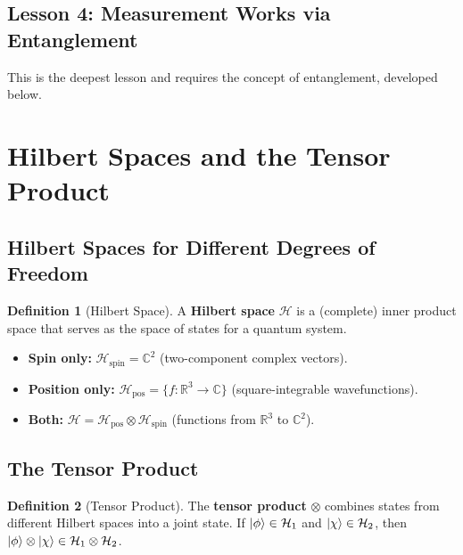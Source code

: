 \documentclass[11pt,a4paper]{article}
\theoremstyle{definition}
\newtheorem{definition}{Definition}[section]
\theoremstyle{plain}
\theoremstyle{remark}
\begin{document}
\subsection{Lesson 4: Measurement Works via Entanglement}

This is the deepest lesson and requires the concept of entanglement, developed below.

\section{Hilbert Spaces and the Tensor Product}

\subsection{Hilbert Spaces for Different Degrees of Freedom}

\begin{definition}[Hilbert Space]
    A \textbf{Hilbert space} $\mathcal{H}$ is a (complete) inner product space that serves as the space of states for a quantum system.
\end{definition}

\begin{itemize}
    \item \textbf{Spin only:} $\mathcal{H}_{\text{spin}} = \mathbb{C}^2$ (two-component complex vectors).
    \item \textbf{Position only:} $\mathcal{H}_{\text{pos}} = \{f : \mathbb{R}^3 \to \mathbb{C}\}$ (square-integrable wavefunctions).
    \item \textbf{Both:} $\mathcal{H} = \mathcal{H}_{\text{pos}} \otimes \mathcal{H}_{\text{spin}}$ (functions from $\mathbb{R}^3$ to $\mathbb{C}^2$).
\end{itemize}

\subsection{The Tensor Product}

\begin{definition}[Tensor Product]
    The \textbf{tensor product} $\otimes$ combines states from different Hilbert spaces into a joint state. If $\ket{\phi} \in \mathcal{H}_1$ and $\ket{\chi} \in \mathcal{H}_2$, then $\ket{\phi}\otimes\ket{\chi} \in \mathcal{H}_1 \otimes \mathcal{H}_2$.
\end{definition}
\end{document}
